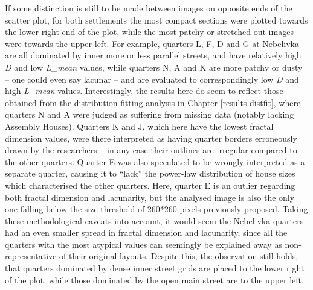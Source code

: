 \documentclass[
  12pt,
]{book}
\begin{document}
If some distinction is still to be made between images on opposite ends of the scatter plot, for both settlements the most compact sections were plotted towards the lower right end of the plot, while the most patchy or stretched-out images were towards the upper left. For example, quarters L, F, D and G at Nebelivka are all dominated by inner more or less parallel streets, and have relatively high \emph{D} and low \emph{L\_mean} values, while quarters N, A and K are more patchy or dusty -- one could even say lacunar -- and are evaluated to correspondingly low \emph{D} and high \emph{L\_mean} values. Interestingly, the results here do seem to reflect those obtained from the distribution fitting analysis in Chapter \ref{results-distfit}, where quarters N and A were judged as suffering from missing data (notably lacking Assembly Houses). Quarters K and J, which here have the lowest fractal dimension values, were there interpreted as having quarter borders erroneously drawn by the researchers -- in any case their outlines are irregular compared to the other quarters. Quarter E was also speculated to be wrongly interpreted as a separate quarter, causing it to ``lack'' the power-law distribution of house sizes which characterised the other quarters. Here, quarter E is an outlier regarding both fractal dimension and lacunarity, but the analysed image is also the only one falling below the size threshold of 260*260 pixels previously proposed. Taking these methodological caveats into account, it would seem the Nebelivka quarters had an even smaller spread in fractal dimension and lacunarity, since all the quarters with the most atypical values can seemingly be explained away as non-representative of their original layouts. Despite this, the observation still holds, that quarters dominated by dense inner street grids are placed to the lower right of the plot, while those dominated by the open main street are to the upper left.
\end{document}
